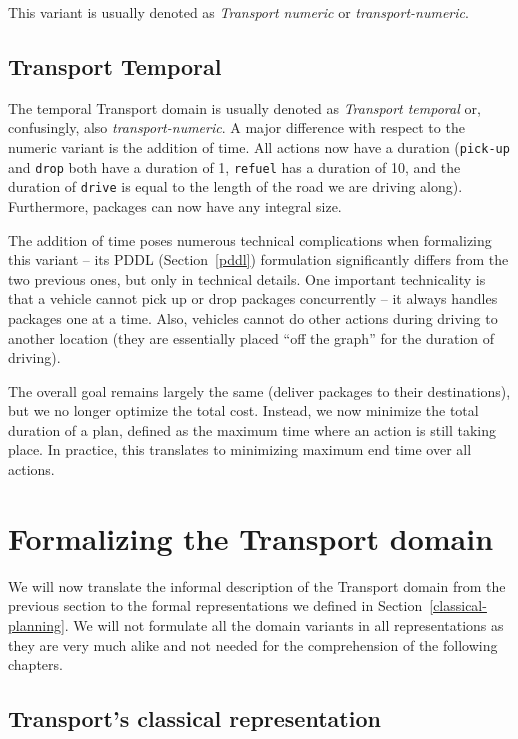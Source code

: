 This variant is usually denoted as \textit{Transport numeric} or \textit{transport-numeric}.

\subsection{Transport Temporal}\label{transport-temporal}

The temporal Transport domain is usually denoted as \textit{Transport temporal} or, confusingly,
also \textit{transport-numeric}. A major difference with respect to the numeric variant is
the addition of time. All actions now have a duration (\verb+pick-up+ and \verb+drop+ both have a
duration of 1, \verb+refuel+ has a duration of 10, and the duration of \verb+drive+ is
equal to the length of the road we are driving along). Furthermore, packages can now have any integral size.

The addition of time poses numerous technical complications when formalizing this variant
-- its PDDL (Section~\ref{pddl}) formulation significantly differs from the two previous ones, but only in technical details.
One important technicality is that a vehicle cannot pick up or drop packages concurrently -- it always handles packages one at a time. Also, vehicles cannot do other actions during driving to another location (they are essentially placed ``off the graph'' for the duration of driving).

The overall goal remains largely the same (deliver packages to their destinations), but we no longer optimize the total cost. Instead, we now minimize the total duration of a plan,
defined as the maximum time where an action is still taking place.
In practice, this translates to minimizing maximum end time over all actions.

\section{Formalizing the Transport domain}

We will now translate the informal description of the Transport domain from the previous section to the formal representations we defined in Section~\ref{classical-planning}. We will not formulate all the domain variants in all representations as
they are very much alike and not needed for the comprehension of the following chapters.

\subsection{Transport's classical representation}\label{transport-classical-representation}

